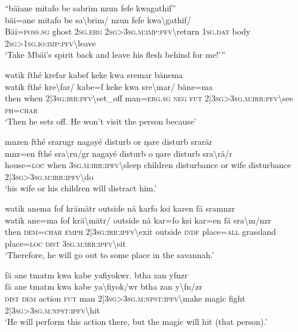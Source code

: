 \ea\label{ex:a4346}
``bäiane mitafo be sabrim nzun fefe kwagathif''\\
\gll bäi=ane	mitafo	be	sa{\textbackslash}brim/	nzun	fefe	kwa{\textbackslash}gathif/\\
     Bäi=\textsc{poss}.\textsc{sg}	ghost	2\textsc{sg}.\textsc{erg}	2\textsc{sg}>3\textsc{sg}.\textsc{m}:\textsc{imp}:\textsc{pfv}{\textbackslash}return	1\textsc{sg}.\textsc{dat}	body	2\textsc{sg}>1\textsc{sg}.\textsc{io}:\textsc{imp}:\textsc{pfv}{\textbackslash}leave\\
\glt `Take Mbäi's spirit back and leave his flesh behind for me!'''
\z

\ea\label{ex:a4347}
watik fthé krefar kabef keke kwa sremar bänema\\
\gll watik	fthé	kre{\textbackslash}far/	kabe=f	keke	kwa	sre{\textbackslash}mar/	bäne=ma\\
     then	when	2|3\textsc{sg}:\textsc{irr}:\textsc{pfv}{\textbackslash}set\_off	man=\textsc{erg}.\textsc{sg}	\textsc{neg}	\textsc{fut}	2|3\textsc{sg}>3\textsc{sg}.\textsc{m}:\textsc{irr}:\textsc{pfv}{\textbackslash}see	\textsc{ph}=\textsc{char}\\
\glt `Then he sets off. He won't visit the person because'
\z

\ea\label{ex:a4349}
mnzen fthé srarugr nagayé disturb or ŋare disturb srarär\\
\gll mnz=en	fthé	sra{\textbackslash}ru/gr	nagayé	disturb	o	ŋare	disturb	sra{\textbackslash}rä/r\\
     house=\textsc{loc}	when	3\textsc{sg}.\textsc{m}:\textsc{irr}:\textsc{ipfv}{\textbackslash}sleep	children	disturbance	or	wife	disturbance	2|3\textsc{sg}>3\textsc{sg}.\textsc{m}:\textsc{irr}:\textsc{ipfv}{\textbackslash}do\\
\glt `his wife or his children will distract him.'
\z

\ea\label{ex:a4350}
watik anema fof krämätr outside nä karfo ksi karen fä sramnzr\\
\gll watik	ane=ma	fof	krä{\textbackslash}mätr/	outside	nä	kar=fo	ksi	kar=en	fä	sra{\textbackslash}m/nzr\\
     then	\textsc{dem}=\textsc{char}	\textsc{emph}	2|3\textsc{sg}:\textsc{irr}:\textsc{ipfv}{\textbackslash}exit	outside	\textsc{indf}	place=\textsc{all}	grassland	place=\textsc{loc}	\textsc{dist}	3\textsc{sg}.\textsc{m}:\textsc{irr}:\textsc{ipfv}{\textbackslash}sit\\
\glt `Therefore, he will go out to some place in the savannah.'
\z

\newpage
\ea\label{ex:a4351}
fä ane tmatm kwa kabe yafiyokwr. btha zan yfnzr\\
\gll fä	ane	tmatm	kwa	kabe	ya{\textbackslash}fiyok/wr	btha	zan	y{\textbackslash}fn/zr\\
     \textsc{dist}	\textsc{dem}	action	\textsc{fut}	man	2|3\textsc{sg}>3\textsc{sg}.\textsc{m}:\textsc{npst}:\textsc{ipfv}{\textbackslash}make	magic	fight	2|3\textsc{sg}>3\textsc{sg}.\textsc{m}:\textsc{npst}:\textsc{ipfv}{\textbackslash}hit\\
\glt `He will perform this action there, but the magic will hit (that person).'
\z

